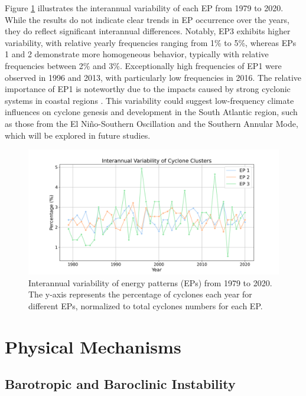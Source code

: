 Figure \ref{fig:lps_interannual_variability} illustrates the interannual variability of each EP from 1979 to 2020. While the results do not indicate clear trends in EP occurrence over the years, they do reflect significant interannual differences. Notably, EP3 exhibits higher variability, with relative yearly frequencies ranging from 1\% to 5\%, whereas EPs 1 and 2 demonstrate more homogeneous behavior, typically with relative frequencies between 2\% and 3\%. Exceptionally high frequencies of EP1 were observed in 1996 and 2013, with particularly low frequencies in 2016. The relative importance of EP1 is noteworthy due to the impacts caused by strong cyclonic systems in coastal regions \citep{de2021ocean,cardoso2022synoptic,leal2023identification}. This variability could suggest low-frequency climate influences on cyclone genesis and development in the South Atlantic region, such as those from the El Niño-Southern Oscillation and the Southern Annular Mode, which will be explored in future studies.


\begin{figure}[!htbp]
    \centering
    \includegraphics[width=\textwidth]{figs_6/lps_interannual_variability.png}
    \caption[Energy Patterns - Interannual Variability]{Interannual variability of energy patterns (EPs) from 1979 to 2020. The y-axis represents the percentage of cyclones each year for different EPs, normalized to total cyclones numbers for each EP.}
    \label{fig:lps_interannual_variability}
\end{figure}

\section{Physical Mechanisms}

\subsection{Barotropic and Baroclinic Instability}\label{sec:ibt_ibc}

